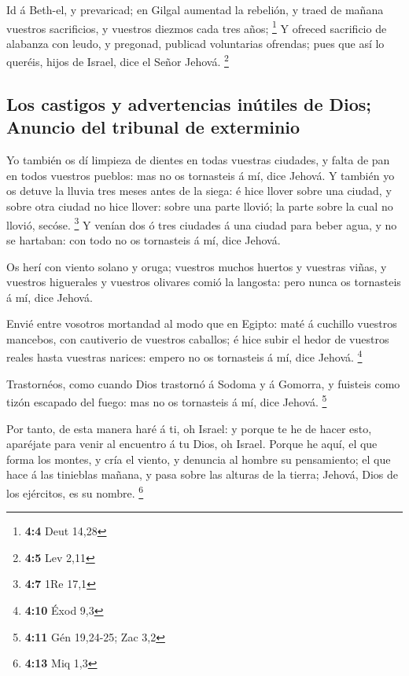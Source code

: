  Id á Beth-el, y prevaricad; en Gilgal aumentad la
rebelión, y traed de mañana vuestros sacrificios, y vuestros diezmos
cada tres años; \footnote{\textbf{4:4} Deut 14,28}  Y
ofreced sacrificio de alabanza con leudo, y pregonad, publicad
voluntarias ofrendas; pues que así lo queréis, hijos de Israel, dice el
Señor Jehová. \footnote{\textbf{4:5} Lev 2,11}

\hypertarget{los-castigos-y-advertencias-inuxfatiles-de-dios-anuncio-del-tribunal-de-exterminio}{%
\subsection{Los castigos y advertencias inútiles de Dios; Anuncio del
tribunal de
exterminio}\label{los-castigos-y-advertencias-inuxfatiles-de-dios-anuncio-del-tribunal-de-exterminio}}

 Yo también os dí limpieza de dientes en todas vuestras
ciudades, y falta de pan en todos vuestros pueblos: mas no os tornasteis
á mí, dice Jehová.  Y también yo os detuve la lluvia tres
meses antes de la siega: é hice llover sobre una ciudad, y sobre otra
ciudad no hice llover: sobre una parte llovió; la parte sobre la cual no
llovió, secóse. \footnote{\textbf{4:7} 1Re 17,1}  Y venían
dos ó tres ciudades á una ciudad para beber agua, y no se hartaban: con
todo no os tornasteis á mí, dice Jehová.

 Os herí con viento solano y oruga; vuestros muchos
huertos y vuestras viñas, y vuestros higuerales y vuestros olivares
comió la langosta: pero nunca os tornasteis á mí, dice Jehová.

 Envié entre vosotros mortandad al modo que en Egipto:
maté á cuchillo vuestros mancebos, con cautiverio de vuestros caballos;
é hice subir el hedor de vuestros reales hasta vuestras narices: empero
no os tornasteis á mí, dice Jehová. \footnote{\textbf{4:10} Éxod 9,3}

 Trastornéos, como cuando Dios trastornó á Sodoma y á
Gomorra, y fuisteis como tizón escapado del fuego: mas no os tornasteis
á mí, dice Jehová. \footnote{\textbf{4:11} Gén 19,24-25; Zac 3,2}

 Por tanto, de esta manera haré á ti, oh Israel: y porque
te he de hacer esto, aparéjate para venir al encuentro á tu Dios, oh
Israel.  Porque he aquí, el que forma los montes, y cría
el viento, y denuncia al hombre su pensamiento; el que hace á las
tinieblas mañana, y pasa sobre las alturas de la tierra; Jehová, Dios de
los ejércitos, es su nombre. \footnote{\textbf{4:13} Miq 1,3}

